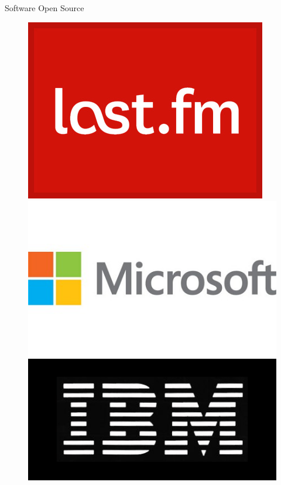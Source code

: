 \begin{frame}{Software Open Source}
\begin{figure}[hb]
     \includegraphics[scale=0.1]{lastfm.jpg}
     \includegraphics[scale=0.1]{microsoft-logo.jpg}
     \includegraphics[scale=0.1]{IBM-logo.jpg}
     \label{fig11:fb}
   \end{figure}



\end{frame}
